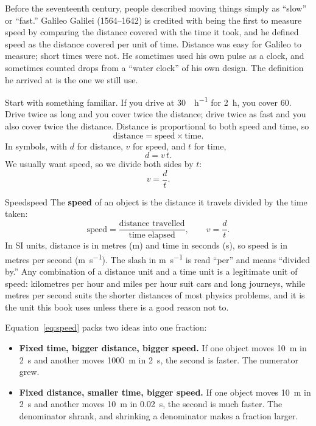 \documentclass[11pt,twoside,openany]{book}
\begin{document}
Before the seventeenth century, people described moving things simply as ``slow'' or ``fast.'' Galileo Galilei (1564--1642) is credited with being the first to measure speed by comparing the distance covered with the time it took, and he defined speed as the distance covered per unit of time. Distance was easy for Galileo to measure; short times were not. He sometimes used his own pulse as a clock, and sometimes counted drops from a ``water clock'' of his own design. The definition he arrived at is the one we still use.

Start with something familiar. If you drive at \SI{30}{\mile\per\hour} for \SI{2}{\hour}, you cover \SI{60}{\mile}. Drive twice as long and you cover twice the distance; drive twice as fast and you also cover twice the distance. Distance is proportional to both speed and time, so
\begin{equation}
\text{distance} = \text{speed}\times\text{time}.
\label{eq:dvt}
\end{equation}
In symbols, with $d$ for distance, $v$ for speed, and $t$ for time,
\begin{equation}
d = v\,t.
\label{eq:dvt-symbols}
\end{equation}
We usually want speed, so we divide both sides by $t$:
\begin{equation}
v = \frac{d}{t}.
\label{eq:speed}
\end{equation}

\begin{definition}{Speed}{speed}
The \textbf{speed} of an object is the distance it travels divided by the time taken:
\[
\text{speed} = \frac{\text{distance travelled}}{\text{time elapsed}}, \qquad v = \frac{d}{t}.
\]
In SI units, distance is in metres (\si{\metre}) and time in seconds (\si{\second}), so speed is in metres per second (\si{\metre\per\second}). The slash in \si{\metre\per\second} is read ``per'' and means ``divided by.'' Any combination of a distance unit and a time unit is a legitimate unit of speed: kilometres per hour and miles per hour suit cars and long journeys, while metres per second suits the shorter distances of most physics problems, and it is the unit this book uses unless there is a good reason not to.
\end{definition}

Equation~\eqref{eq:speed} packs two ideas into one fraction:
\begin{itemize}
  \item \textbf{Fixed time, bigger distance, bigger speed.} If one object moves \SI{10}{\metre} in \SI{2}{\second} and another moves \SI{1000}{\metre} in \SI{2}{\second}, the second is faster. The numerator grew.
  \item \textbf{Fixed distance, smaller time, bigger speed.} If one object moves \SI{10}{\metre} in \SI{2}{\second} and another moves \SI{10}{\metre} in \SI{0.02}{\second}, the second is much faster. The denominator shrank, and shrinking a denominator makes a fraction larger.
\end{itemize}
\end{document}
